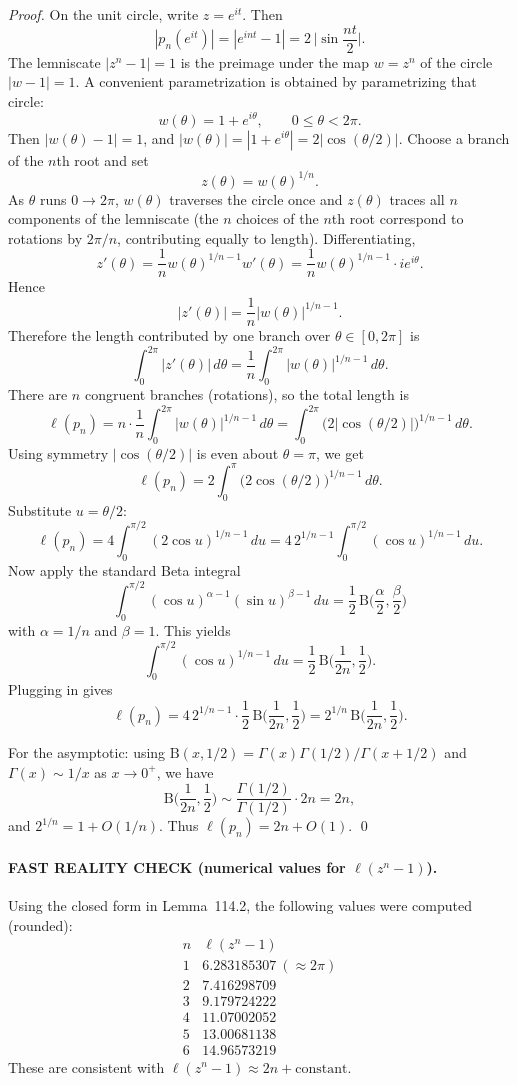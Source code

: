 \emph{Proof.}
On the unit circle, write $z=e^{it}$.  Then
\[
|p_n(e^{it})|=|e^{int}-1|=2\,\big|\sin\frac{nt}{2}\big|.
\]
The lemniscate $|z^n-1|=1$ is the preimage under the map $w=z^n$ of the circle $|w-1|=1$.  A convenient parametrization is obtained by parametrizing that circle:
\[
 w(\theta)=1+e^{i\theta},\qquad 0\le\theta<2\pi.
\]
Then $|w(\theta)-1|=1$, and $|w(\theta)|=|1+e^{i\theta}|=2|\cos(\theta/2)|$.  Choose a branch of the $n$th root and set
\[
 z(\theta)=w(\theta)^{1/n}.
\]
As $\theta$ runs $0\to2\pi$, $w(\theta)$ traverses the circle once and $z(\theta)$ traces all $n$ components of the lemniscate (the $n$ choices of the $n$th root correspond to rotations by $2\pi/n$, contributing equally to length).  Differentiating,
\[
 z'(\theta)=\frac1n w(\theta)^{1/n-1} w'(\theta)=\frac1n w(\theta)^{1/n-1} \cdot i e^{i\theta}.
\]
Hence
\[
|z'(\theta)|=\frac1n |w(\theta)|^{1/n-1}.
\]
Therefore the length contributed by one branch over $\theta\in[0,2\pi]$ is
\[
\int_0^{2\pi} |z'(\theta)|\,d\theta=\frac1n\int_0^{2\pi} |w(\theta)|^{1/n-1}\,d\theta.
\]
There are $n$ congruent branches (rotations), so the total length is
\[
\ell(p_n)=n\cdot \frac1n\int_0^{2\pi} |w(\theta)|^{1/n-1}\,d\theta=\int_0^{2\pi} \big(2|\cos(\theta/2)|\big)^{1/n-1}\,d\theta.
\]
Using symmetry $|\cos(\theta/2)|$ is even about $\theta=\pi$, we get
\[
\ell(p_n)=2\int_0^{\pi} \big(2\cos(\theta/2)\big)^{1/n-1}\,d\theta.
\]
Substitute $u=\theta/2$:
\[
\ell(p_n)=4\int_0^{\pi/2} (2\cos u)^{1/n-1}\,du = 4\,2^{1/n-1}\int_0^{\pi/2} (\cos u)^{1/n-1}\,du.
\]
Now apply the standard Beta integral
\[
\int_0^{\pi/2} (\cos u)^{\alpha-1}(\sin u)^{\beta-1}\,du = \frac12\,\mathrm B\Big(\frac\alpha2,\frac\beta2\Big)
\]
with $\alpha=1/n$ and $\beta=1$.  This yields
\[
\int_0^{\pi/2} (\cos u)^{1/n-1}\,du = \frac12\,\mathrm B\Big(\frac{1}{2n},\frac12\Big).
\]
Plugging in gives
\[
\ell(p_n)=4\,2^{1/n-1}\cdot \frac12\,\mathrm B\Big(\frac{1}{2n},\frac12\Big)=2^{1/n}\,\mathrm B\Big(\frac{1}{2n},\frac12\Big).
\]

For the asymptotic: using $\mathrm B(x,1/2)=\Gamma(x)\Gamma(1/2)/\Gamma(x+1/2)$ and $\Gamma(x)\sim 1/x$ as $x\to0^+$, we have
\[
\mathrm B\Big(\frac{1}{2n},\frac12\Big)\sim \frac{\Gamma(1/2)}{\Gamma(1/2)}\cdot 2n = 2n,
\]
and $2^{1/n}=1+O(1/n)$.  Thus $\ell(p_n)=2n+O(1)$.
\qed

\paragraph{FAST REALITY CHECK (numerical values for $\ell(z^n-1)$).}
Using the closed form in Lemma~114.2, the following values were computed (rounded):
\[
\begin{array}{c|c}
 n & \ell(z^n-1)\\\hline
 1 & 6.283185307\ (\approx 2\pi)\\
 2 & 7.416298709\\
 3 & 9.179724222\\
 4 & 11.07002052\\
 5 & 13.00681138\\
 6 & 14.96573219
\end{array}
\]
These are consistent with $\ell(z^n-1)\approx 2n+\text{constant}$.

